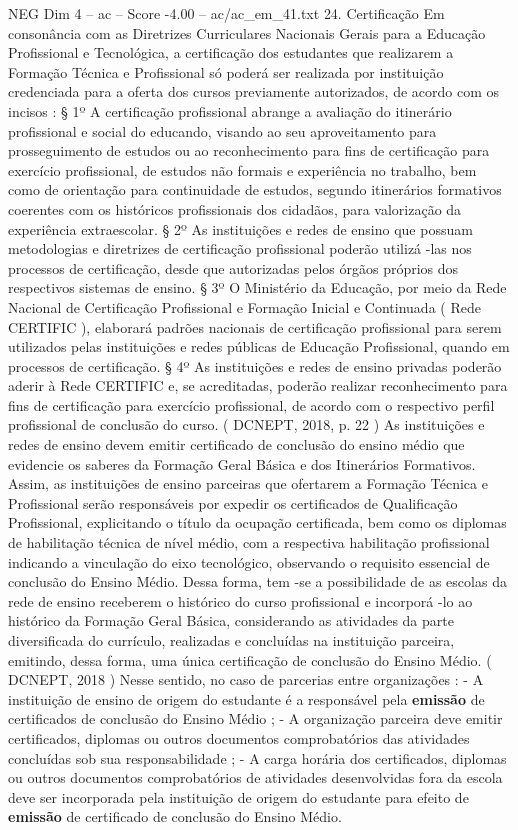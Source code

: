 \begin{textsample}{NEG Dim 4 – ac – Score -4.00 – ac/ac\_em\_41.txt}  \label{ex:f4_neg_042}
24.
Certificação Em consonância com as Diretrizes Curriculares Nacionais Gerais para a Educação Profissional e Tecnológica, a certificação dos estudantes que realizarem a Formação Técnica e Profissional só poderá ser realizada por instituição credenciada para a oferta dos cursos previamente autorizados, de acordo com os incisos : § 1º A certificação profissional abrange a avaliação do itinerário profissional e social do educando, visando ao seu aproveitamento para prosseguimento de estudos ou ao reconhecimento para fins de certificação para exercício profissional, de estudos não formais e experiência no trabalho, bem como de orientação para continuidade de estudos, segundo itinerários formativos coerentes com os históricos profissionais dos cidadãos, para valorização da experiência extraescolar. § 2º As instituições e redes de ensino que possuam metodologias e diretrizes de certificação profissional poderão utilizá -las nos processos de certificação, desde que autorizadas pelos órgãos próprios dos respectivos sistemas de ensino. § 3º O Ministério da Educação, por meio da Rede Nacional de Certificação Profissional e Formação Inicial e Continuada ( Rede CERTIFIC ), elaborará padrões nacionais de certificação profissional para serem utilizados pelas instituições e redes públicas de Educação Profissional, quando em processos de certificação. § 4º As instituições e redes de ensino privadas poderão aderir à Rede CERTIFIC e, se acreditadas, poderão realizar reconhecimento para fins de certificação para exercício profissional, de acordo com o respectivo perfil profissional de conclusão do curso. ( DCNEPT, 2018, p. 22 ) As instituições e redes de ensino devem emitir certificado de conclusão do ensino médio que evidencie os saberes da Formação Geral Básica e dos Itinerários Formativos.
Assim, as instituições de ensino parceiras que ofertarem a Formação Técnica e Profissional serão responsáveis por expedir os certificados de Qualificação Profissional, explicitando o título da ocupação certificada, bem como os diplomas de habilitação técnica de nível médio, com a respectiva habilitação profissional indicando a vinculação do eixo tecnológico, observando o requisito essencial de conclusão do Ensino Médio.
Dessa forma, tem -se a possibilidade de as escolas da rede de ensino receberem o histórico do curso profissional e incorporá -lo ao histórico da Formação Geral Básica, considerando as atividades da parte diversificada do currículo, realizadas e concluídas na instituição parceira, emitindo, dessa forma, uma única certificação de conclusão do Ensino Médio. ( DCNEPT, 2018 ) Nesse sentido, no caso de parcerias entre organizações : - A instituição de ensino de origem do estudante é a responsável pela \textbf{emissão} de certificados de conclusão do Ensino Médio ; - A organização parceira deve emitir certificados, diplomas ou outros documentos comprobatórios das atividades concluídas sob sua responsabilidade ; - A carga horária dos certificados, diplomas ou outros documentos comprobatórios de atividades desenvolvidas fora da escola deve ser incorporada pela instituição de origem do estudante para efeito de \textbf{emissão} de certificado de conclusão do Ensino Médio.

\end{textsample}
